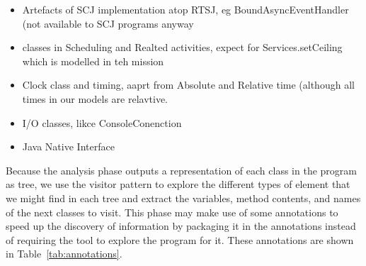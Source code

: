 \documentclass[10pt,a4paper]{article}
\begin{document}
\begin{itemize}
\item Artefacts of SCJ implementation atop RTSJ, eg BoundAsyncEventHandler (not available to SCJ programs anyway
\item classes in Scheduling and Realted activities, expect for Services.setCeiling which is modelled in teh mission
\item Clock class and timing, aaprt from Absolute and Relative time (although all times in our models are relavtive.
\item I/O classes, likce ConsoleConenction
\item Java Native Interface

\end{itemize}

Because the analysis phase outputs a representation of each class in the program as tree, we use the visitor pattern to explore the different types of element that we might find in each tree and extract the variables, method contents, and names of the next classes to visit. This phase may make use of some annotations to speed up the discovery of information by packaging it in the annotations instead of requiring the tool to explore the program for it. These annotations are shown in Table~\ref{tab:annotations}.
\end{document}
